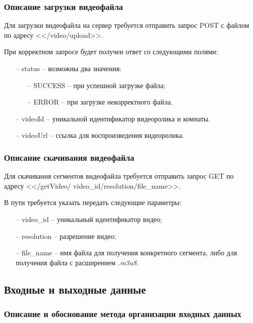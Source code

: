 \documentclass{../includes/TechDoc}
\begin{document}
    \subsubsection{Описание загрузки видеофайла}

    Для загрузки видеофайла на сервер требуется отправить запрос POST с файлом по адресу <</video/upload>>.

    При корректном запросе будет получен ответ со следующими полями:
    \begin{itemize}
    	\item[--] status -- возможны два значения:
    	\begin{itemize}
    		\item[--] SUCCESS -- при успешной загрузке файла;
    		\item[--] ERROR -- при загрузке некорректного файла.
    	\end{itemize}
    	\item[--] videoId -- уникальной идентификатор видеоролика и комнаты.
    	\item[--] videoUrl -- ссылка для воспроизведения видеоролика.
    \end{itemize}

    \subsubsection{Описание скачивания видеофайла}

    Для скачивания сегментов видеофайла требуется отправить запрос GET по адресу <</getVideo/ {video\_id}/{resolution}/{file\_name}>>.

    В пути требуется указать передать следующие параметры:
    \begin{itemize}
    	\item[--] video\_id -- уникальный идентификатор видео;
    	\item[--] resolution -- разрешение видео;
    	\item[--] file\_name -- имя файла для получения конкретного сегмента, либо для получения файла с расширением \emph{.m3u8}.
    \end{itemize}


    \subsection{Входные и выходные данные}

    \subsubsection{Описание и обоснование метода организации входных данных}
\end{document}
